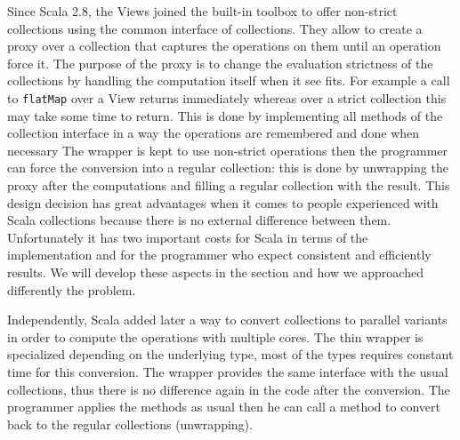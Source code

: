 \documentclass[a4paper,12pt,twocolumn]{article}
\begin{document}
Since Scala 2.8, the Views joined the built-in toolbox to offer non-strict collections using the common interface of collections.
They allow to create a proxy over a collection that captures the operations on them until an operation force it.
The purpose of the proxy is to change the evaluation strictness of the collections by handling the computation itself when it see fits.
For example a call to \verb|flatMap| over a View returns immediately whereas over a strict collection this may take some time to return.
This is done by implementing all methods of the collection interface in a way the operations are remembered and done when necessary
The wrapper is kept to use non-strict operations then the programmer can force the conversion into a regular collection: this is done by unwrapping the proxy after the computations and filling a regular collection with the result.
This design decision has great advantages when it comes to people experienced with Scala collections because there is no external difference between them.
Unfortunately it has two important costs for Scala in terms of the implementation and for the programmer who expect consistent and efficiently results.
We will develop these aspects in the section and how we approached differently the problem.

Independently, Scala added later a way to convert collections to parallel variants in order to compute the operations with multiple cores.
The thin wrapper is specialized depending on the underlying type, most of the types requires constant time for this conversion.
The wrapper provides the same interface with the usual collections, thus there is no difference again in the code after the conversion.
The programmer applies the methods as usual then he can call a method to convert back to the regular collections (unwrapping).
\end{document}
